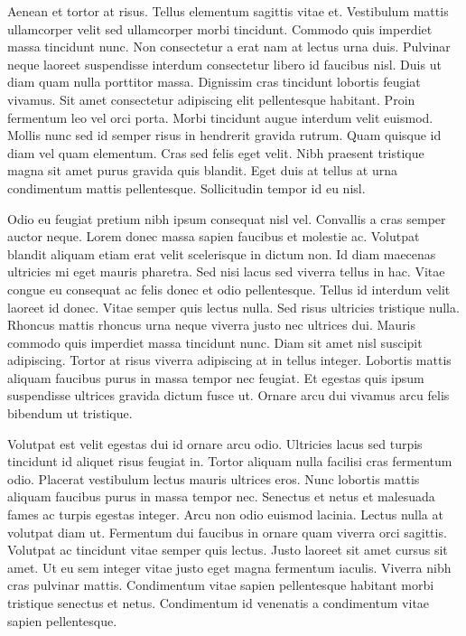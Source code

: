 \documentclass[11pt,a4paper]{article}
\begin{document}
Aenean et tortor at risus. Tellus elementum sagittis vitae et. Vestibulum mattis ullamcorper velit sed ullamcorper morbi tincidunt. Commodo quis imperdiet massa tincidunt nunc. Non consectetur a erat nam at lectus urna duis. Pulvinar neque laoreet suspendisse interdum consectetur libero id faucibus nisl. Duis ut diam quam nulla porttitor massa. Dignissim cras tincidunt lobortis feugiat vivamus. Sit amet consectetur adipiscing elit pellentesque habitant. Proin fermentum leo vel orci porta. Morbi tincidunt augue interdum velit euismod. Mollis nunc sed id semper risus in hendrerit gravida rutrum. Quam quisque id diam vel quam elementum. Cras sed felis eget velit. Nibh praesent tristique magna sit amet purus gravida quis blandit. Eget duis at tellus at urna condimentum mattis pellentesque. Sollicitudin tempor id eu nisl.

Odio eu feugiat pretium nibh ipsum consequat nisl vel. Convallis a cras semper auctor neque. Lorem donec massa sapien faucibus et molestie ac. Volutpat blandit aliquam etiam erat velit scelerisque in dictum non. Id diam maecenas ultricies mi eget mauris pharetra. Sed nisi lacus sed viverra tellus in hac. Vitae congue eu consequat ac felis donec et odio pellentesque. Tellus id interdum velit laoreet id donec. Vitae semper quis lectus nulla. Sed risus ultricies tristique nulla. Rhoncus mattis rhoncus urna neque viverra justo nec ultrices dui. Mauris commodo quis imperdiet massa tincidunt nunc. Diam sit amet nisl suscipit adipiscing. Tortor at risus viverra adipiscing at in tellus integer. Lobortis mattis aliquam faucibus purus in massa tempor nec feugiat. Et egestas quis ipsum suspendisse ultrices gravida dictum fusce ut. Ornare arcu dui vivamus arcu felis bibendum ut tristique.

Volutpat est velit egestas dui id ornare arcu odio. Ultricies lacus sed turpis tincidunt id aliquet risus feugiat in. Tortor aliquam nulla facilisi cras fermentum odio. Placerat vestibulum lectus mauris ultrices eros. Nunc lobortis mattis aliquam faucibus purus in massa tempor nec. Senectus et netus et malesuada fames ac turpis egestas integer. Arcu non odio euismod lacinia. Lectus nulla at volutpat diam ut. Fermentum dui faucibus in ornare quam viverra orci sagittis. Volutpat ac tincidunt vitae semper quis lectus. Justo laoreet sit amet cursus sit amet. Ut eu sem integer vitae justo eget magna fermentum iaculis. Viverra nibh cras pulvinar mattis. Condimentum vitae sapien pellentesque habitant morbi tristique senectus et netus. Condimentum id venenatis a condimentum vitae sapien pellentesque.
\end{document}
